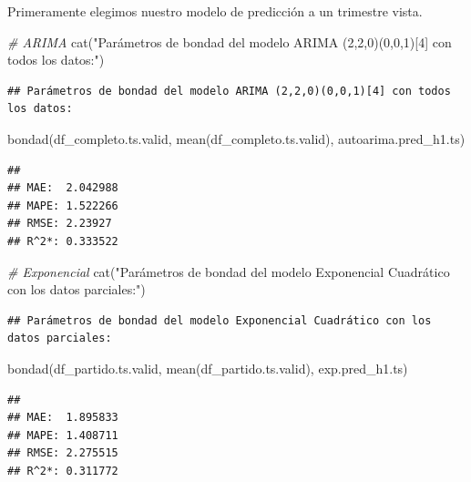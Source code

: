 \documentclass[
]{article}
\newenvironment{Shaded}{\begin{snugshade}}{\end{snugshade}}
\newcommand{\CommentTok}[1]{\textcolor[rgb]{0.56,0.35,0.01}{\textit{#1}}}
\newcommand{\FunctionTok}[1]{\textcolor[rgb]{0.00,0.00,0.00}{#1}}
\newcommand{\NormalTok}[1]{#1}
\newcommand{\StringTok}[1]{\textcolor[rgb]{0.31,0.60,0.02}{#1}}
\begin{document}
Primeramente elegimos nuestro modelo de predicción a un trimestre vista.

\begin{Shaded}
\begin{Highlighting}[]
\CommentTok{\# ARIMA}
\FunctionTok{cat}\NormalTok{(}\StringTok{"Parámetros de bondad del modelo ARIMA (2,2,0)(0,0,1)[4] con todos los datos:"}\NormalTok{)}
\end{Highlighting}
\end{Shaded}

\begin{verbatim}
## Parámetros de bondad del modelo ARIMA (2,2,0)(0,0,1)[4] con todos los datos:
\end{verbatim}

\begin{Shaded}
\begin{Highlighting}[]
\FunctionTok{bondad}\NormalTok{(df\_completo.ts.valid, }\FunctionTok{mean}\NormalTok{(df\_completo.ts.valid), autoarima.pred\_h1.ts) }
\end{Highlighting}
\end{Shaded}

\begin{verbatim}
## 
## MAE:  2.042988 
## MAPE: 1.522266 
## RMSE: 2.23927 
## R^2*: 0.333522
\end{verbatim}

\begin{Shaded}
\begin{Highlighting}[]
\CommentTok{\# Exponencial}
\FunctionTok{cat}\NormalTok{(}\StringTok{"Parámetros de bondad del modelo Exponencial Cuadrático con los datos parciales:"}\NormalTok{)}
\end{Highlighting}
\end{Shaded}

\begin{verbatim}
## Parámetros de bondad del modelo Exponencial Cuadrático con los datos parciales:
\end{verbatim}

\begin{Shaded}
\begin{Highlighting}[]
\FunctionTok{bondad}\NormalTok{(df\_partido.ts.valid, }\FunctionTok{mean}\NormalTok{(df\_partido.ts.valid), exp.pred\_h1.ts)}
\end{Highlighting}
\end{Shaded}

\begin{verbatim}
## 
## MAE:  1.895833 
## MAPE: 1.408711 
## RMSE: 2.275515 
## R^2*: 0.311772
\end{verbatim}
\end{document}

